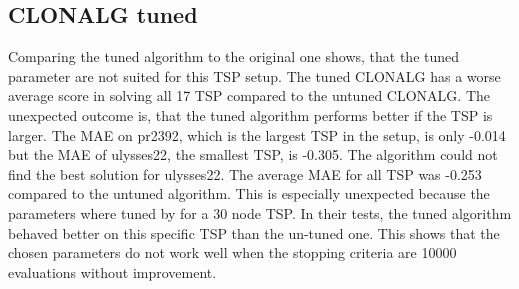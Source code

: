 \subsection{CLONALG tuned}
Comparing the tuned algorithm to the original one shows, that the tuned parameter are not suited for this TSP setup. The tuned CLONALG has a worse average score in solving all 17 TSP compared to the untuned CLONALG. The unexpected outcome is, that the tuned algorithm performs better if the TSP is larger. The MAE on pr2392, which is the largest TSP in the setup, is only -0.014 but the MAE of ulysses22, the smallest TSP, is -0.305. The algorithm could not find the best solution for ulysses22. The average MAE for all TSP was -0.253 compared to the untuned algorithm. This is especially unexpected because the parameters where tuned by \cite{DEC02} for a 30 node TSP. In their tests, the tuned algorithm behaved better on this specific TSP than the un-tuned one. This shows that the chosen parameters do not work well when the stopping criteria are 10000 evaluations without improvement.
